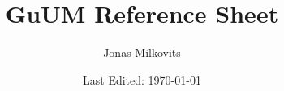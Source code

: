 


\begin{titlepage}
  \title{GuUM Reference Sheet} %
  \author{Jonas Milkovits}
  \date{Last Edited: \today}
\end{titlepage}




\maketitle
{} %
\tableofcontents
\clearpage
{} %


\clearpage


